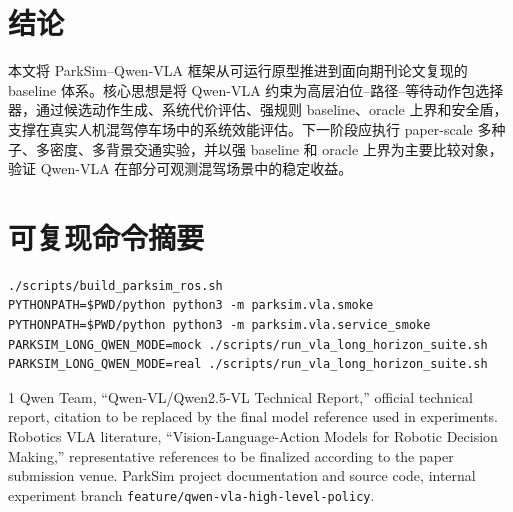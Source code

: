 \documentclass[conference]{IEEEtran}
\begin{document}
\section{结论}
本文将 ParkSim--Qwen-VLA 框架从可运行原型推进到面向期刊论文复现的 baseline 体系。核心思想是将 Qwen-VLA 约束为高层泊位--路径--等待动作包选择器，通过候选动作生成、系统代价评估、强规则 baseline、oracle 上界和安全盾，支撑在真实人机混驾停车场中的系统效能评估。下一阶段应执行 paper-scale 多种子、多密度、多背景交通实验，并以强 baseline 和 oracle 上界为主要比较对象，验证 Qwen-VLA 在部分可观测混驾场景中的稳定收益。

\section*{可复现命令摘要}
\begin{verbatim}
./scripts/build_parksim_ros.sh
PYTHONPATH=$PWD/python python3 -m parksim.vla.smoke
PYTHONPATH=$PWD/python python3 -m parksim.vla.service_smoke
PARKSIM_LONG_QWEN_MODE=mock ./scripts/run_vla_long_horizon_suite.sh
PARKSIM_LONG_QWEN_MODE=real ./scripts/run_vla_long_horizon_suite.sh
\end{verbatim}

\begin{thebibliography}{1}
 Qwen Team, ``Qwen-VL/Qwen2.5-VL Technical Report,'' official technical report, citation to be replaced by the final model reference used in experiments.
 Robotics VLA literature, ``Vision-Language-Action Models for Robotic Decision Making,'' representative references to be finalized according to the paper submission venue.
 ParkSim project documentation and source code, internal experiment branch \texttt{feature/qwen-vla-high-level-policy}.
\end{thebibliography}
\end{document}
